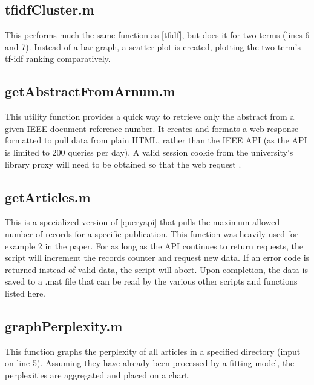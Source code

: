 \documentclass{article}
\begin{document}


\subsection{tfidfCluster.m}

This performs much the same function as \ref{tfidf}, but does it for two terms (lines 6 and 7). Instead of a bar graph, a scatter plot is created, plotting the two term's tf-idf ranking comparatively.



\subsection{getAbstractFromArnum.m}

This utility function provides a quick way to retrieve only the abstract from a given IEEE document reference number. It creates and formats a web response formatted to pull data from plain HTML, rather than the IEEE API (as the API is limited to 200 queries per day). A valid session cookie from the university's library proxy will need to be obtained so that the web request .



\subsection{getArticles.m}

This is a specialized version of \ref{queryapi} that pulls the maximum allowed number of records for a specific publication. This function was heavily used for example 2 in the paper. For as long as the API continues to return requests, the script will increment the records counter and request new data. If an error code is returned instead of valid data, the script will abort. Upon completion, the data is saved to a .mat file that can be read by the various other scripts and functions listed here.



\subsection{graphPerplexity.m}

This function graphs the perplexity of all articles in a specified directory (input on line 5). Assuming they have already been processed by a fitting model, the perplexities are aggregated and placed on a chart.


\end{document}
